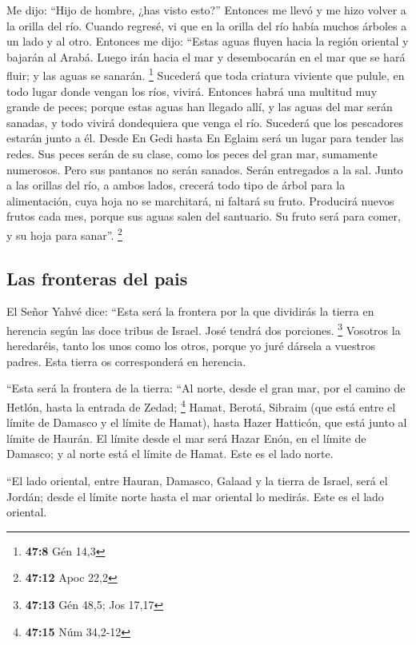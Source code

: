 \begin{paracol}{2}
 Me dijo: ``Hijo de hombre, ¿has visto esto?'' Entonces me
llevó y me hizo volver a la orilla del río.  Cuando
regresé, vi que en la orilla del río había muchos árboles a un lado y al
otro.  Entonces me dijo: ``Estas aguas fluyen hacia la
región oriental y bajarán al Arabá. Luego irán hacia el mar y
desembocarán en el mar que se hará fluir; y las aguas se sanarán.
\footnote{\textbf{47:8} Gén 14,3}  Sucederá que toda
criatura viviente que pulule, en todo lugar donde vengan los ríos,
vivirá. Entonces habrá una multitud muy grande de peces; porque estas
aguas han llegado allí, y las aguas del mar serán sanadas, y todo vivirá
dondequiera que venga el río.  Sucederá que los
pescadores estarán junto a él. Desde En Gedi hasta En Eglaim será un
lugar para tender las redes. Sus peces serán de su clase, como los peces
del gran mar, sumamente numerosos.  Pero sus pantanos no
serán sanados. Serán entregados a la sal.  Junto a las
orillas del río, a ambos lados, crecerá todo tipo de árbol para la
alimentación, cuya hoja no se marchitará, ni faltará su fruto. Producirá
nuevos frutos cada mes, porque sus aguas salen del santuario. Su fruto
será para comer, y su hoja para sanar''. \footnote{\textbf{47:12} Apoc
  22,2}

\hypertarget{las-fronteras-del-pais}{%
\subsection{Las fronteras del pais}\label{las-fronteras-del-pais}}

 El Señor Yahvé dice: ``Esta será la frontera por la que
dividirás la tierra en herencia según las doce tribus de Israel. José
tendrá dos porciones. \footnote{\textbf{47:13} Gén 48,5; Jos 17,17}
 Vosotros la heredaréis, tanto los unos como los otros,
porque yo juré dársela a vuestros padres. Esta tierra os corresponderá
en herencia.

 ``Esta será la frontera de la tierra: ``Al norte, desde
el gran mar, por el camino de Hetlón, hasta la entrada de Zedad;
\footnote{\textbf{47:15} Núm 34,2-12}  Hamat, Berotá,
Sibraim (que está entre el límite de Damasco y el límite de Hamat),
hasta Hazer Hatticón, que está junto al límite de Haurán.
 El límite desde el mar será Hazar Enón, en el límite de
Damasco; y al norte está el límite de Hamat. Este es el lado norte.

 ``El lado oriental, entre Hauran, Damasco, Galaad y la
tierra de Israel, será el Jordán; desde el límite norte hasta el mar
oriental lo medirás. Este es el lado oriental.


\end{paracol}

